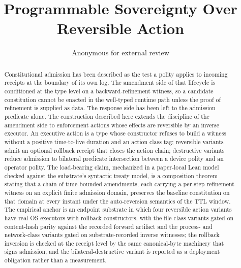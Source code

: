 \documentclass[11pt,letterpaper]{article}
\title{Programmable Sovereignty Over Reversible Action}
\author{Anonymous for external review}
\date{}
\begin{document}
\maketitle

\begin{abstract}
Constitutional admission has been described as the test a polity applies
to incoming receipts at the boundary of its own log. The amendment side
of that lifecycle is conditioned at the type level on a backward-refinement
witness, so a candidate constitution cannot be enacted in the well-typed
runtime path unless the proof of refinement is supplied as data. The
response side has been left to the admission predicate alone. The
construction described here extends the discipline of the amendment
side to enforcement actions whose effects are reversible by an inverse
executor. An executive action is a type whose constructor refuses to
build a witness without a positive time-to-live duration and an action
class tag; reversible variants admit an optional rollback receipt that
closes the action chain; destructive variants reduce admission to
bilateral predicate intersection between a device polity and an operator
polity. The load-bearing claim, mechanized in a paper-local Lean model
checked against the substrate's syntactic treaty model, is a
composition theorem stating that a chain of time-bounded amendments,
each carrying a per-step refinement witness on an explicit finite
admission domain, preserves the baseline constitution on that domain at
every instant under the auto-reversion semantics of the TTL window.
The empirical anchor is an endpoint substrate in which four
reversible action variants have real OS executors with rollback
constructors, with the file-class variants gated on content-hash parity
against the recorded forward artifact and the process- and network-class
variants gated on substrate-recorded inverse witnesses; the rollback
inversion is checked at the receipt level by the same canonical-byte
machinery that signs admission, and the bilateral-destructive variant
is reported as a deployment obligation rather than a measurement.
\end{abstract}











\end{document}
